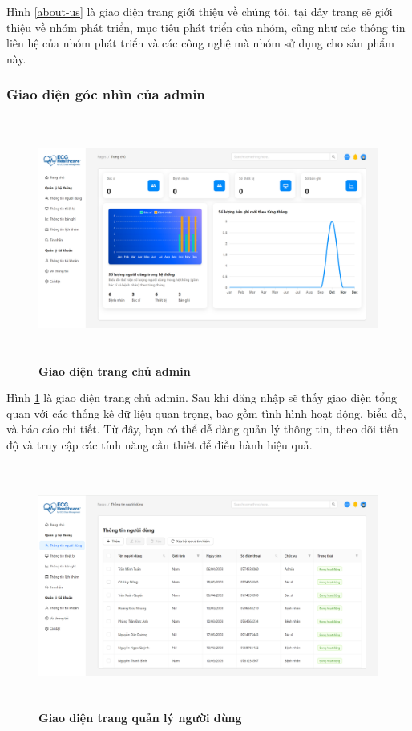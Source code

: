 Hình \ref{about-us} là giao diện trang giới thiệu về chúng tôi, tại đây trang sẽ giới thiệu về nhóm phát triển, mục tiêu phát triển của nhóm, cũng như các thông tin liên hệ của nhóm phát triển và các công nghệ mà nhóm sử dụng cho sản phẩm này.

\subsubsection{Giao diện góc nhìn của admin}
\begin{figure}[H]
	\centering
	\includegraphics[width=15cm,height=8cm]{Images/admin_ui/home.png}
	\caption[Giao diện trang chủ admin]{\bfseries \fontsize{12pt}{0pt}\selectfont Giao diện trang chủ admin}
	\label{home-admin}
\end{figure}

Hình \ref{home-admin} là giao diện trang chủ admin. Sau khi đăng nhập sẽ thấy giao diện tổng quan với các thống kê dữ liệu quan trọng, bao gồm tình hình hoạt động, biểu đồ, và báo cáo chi tiết. Từ đây, bạn có thể dễ dàng quản lý thông tin, theo dõi tiến độ và truy cập các tính năng cần thiết để điều hành hiệu quả. 

\begin{figure}[H]
	\centering
	\includegraphics[width=15cm,height=8cm]{Images/admin_ui/users.png}
	\caption[Giao diện trang quản lý người dùng]{\bfseries \fontsize{12pt}{0pt}\selectfont Giao diện trang quản lý người dùng}
	\label{users-admin}
\end{figure}

